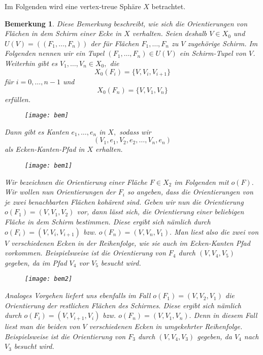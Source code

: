 \documentclass[12pt,titlepage,twoside,cleardoublepage]{article}
\theoremstyle{nummermitklammern}
\newtheorem{bemerkung}[temp]{Bemerkung}
\newtheorem{bemerkung}[zahl]{Bemerkung}
\numberwithin{equation}{section}
\begin{document}
Im Folgenden wird eine vertex-treue Sphäre $X$ betrachtet.
\begin{bemerkung}
Diese Bemerkung beschreibt, wie sich die Orientierungen von Flächen in dem Schirm einer Ecke in $X$ verhalten.
 Seien deshalb $V\in X_0$ und $U(V)=((F_1,\ldots,F_n))$ der für Flächen $F_1,\ldots,F_n$ zu $V$ zugehörige Schirm. Im Folgenden nennen wir ein Tupel $(F_1,\ldots,F_n)\in U(V)$ ein \emph{Schirm-Tupel} von $V$. Weiterhin gibt es $V_1,\ldots,V_n\in X_0,$ die 
\[
X_0(F_i)=\{V,V_i,V_{i+1}\}
\] 
für $i=0,\ldots,n-1$ und 
\[
X_0(F_n)=\{V,V_{1},V_{n}\}
\] erfüllen.
\begin{figure}[H]
\begin{center}
\texttt{[image: bem]}
\end{center}
\end{figure}
Dann gibt es Kanten $e_1,\ldots,e_n$ in $X,$ sodass wir 
\[
(V_1,e_1,V_2,e_2,\ldots,V_n,e_n)
\] 
als Ecken-Kanten-Pfad in $X$ erhalten. 
\begin{figure}[H]
\begin{center}
\texttt{[image: bem1]}
\end{center}
\end{figure}
Wir bezeichnen die Orientierung einer Fläche $F\in X_2$ im Folgenden mit $o(F).$ Wir wollen nun Orientierungen der $F_i$ so angeben, dass die Orientierungen von je zwei benachbarten Flächen kohärent sind. 
Geben wir nun die Orientierung $o(F_1)=(V,V_1,V_2)$ vor, dann lässt sich, die Orientierung einer beliebigen Fläche in dem Schirm bestimmen. Diese ergibt sich nämlich durch $o(F_i)=(V,V_i,V_{i+1})$ bzw. $o(F_n)=(V,V_n,V_1).$ Man liest also die zwei von $V$ verschiedenen Ecken in der Reihenfolge, wie sie auch im Ecken-Kanten Pfad vorkommen. Beispielsweise ist die Orientierung von $F_4$ durch $(V,V_4,V_5)$ gegeben, da im Pfad $V_4$ vor $V_5 $ besucht wird. 
\begin{figure}[H]
\begin{center}
\texttt{[image: bem2]}
\end{center}
\end{figure}
Analoges Vorgehen liefert uns ebenfalls im Fall $o(F_1)=(V,V_2,V_1)$ die Orientierung der restlichen Flächen des Schirmes. Diese ergibt sich nämlich durch $o(F_i)=(V,V_{i+1},V_{i})$ bzw. $o(F_n)=(V,V_1,V_n).$ Denn in diesem Fall liest man die beiden von $V$ verschiedenen Ecken in umgekehrter Reihenfolge. Beispielsweise ist die Orientierung von $F_3$ durch $(V,V_4,V_3)$ gegeben, da $V_4$ nach $V_3$ besucht wird.

\end{bemerkung}
\end{document}
